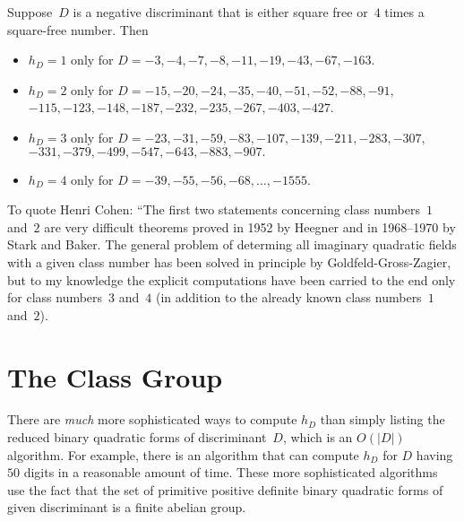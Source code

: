 \documentclass[11pt]{report}
\begin{document}
\begin{theorem}
  Suppose~$D$ is a negative discriminant that is either square
  free or~$4$ times a square-free number. Then
  \begin{itemize}
    \item $h_D=1$ only for $D=-3,-4,-7,-8,-11,-19,-43,-67,-163$.
    \item $h_D=2$ only for $D=-15, -20, -24, -35, -40, -51, -52, -88, -91,$\\
          $ -115,-123, -148, -187, -232, -235, -267, -403, -427$.
    \item $h_D=3$ only for $D=-23,-31,-59,-83,-107,-139,-211,-283,-307,$\\
          $-331,-379,-499,-547,-643,-883,-907.$
    \item $h_D=4$ only for $D=-39,-55,-56,-68,\ldots,-1555.$
  \end{itemize}
\end{theorem}
To quote Henri Cohen: ``The first two statements concerning class
numbers~$1$ and~$2$ are very difficult theorems proved in 1952 by
Heegner and in 1968--1970 by Stark and Baker.  The general problem of
determing all imaginary quadratic fields with a given class number has
been solved in principle by Goldfeld-Gross-Zagier, but to my
knowledge the explicit computations have been carried to the end
only for class numbers~$3$ and~$4$ (in addition to the already known
class numbers~$1$ and~$2$).

\section{The Class Group}
There are {\em much} more sophisticated ways to compute $h_D$ than
simply listing the reduced binary quadratic forms of discriminant~$D$,
which is an $O(|D|)$ algorithm.  For example, there is an algorithm
that can compute $h_D$ for $D$ having $50$ digits in a reasonable
amount of time.  These more sophisticated algorithms use the fact
that the set of primitive positive definite binary quadratic forms
of given discriminant is a finite abelian group.
\end{document}
